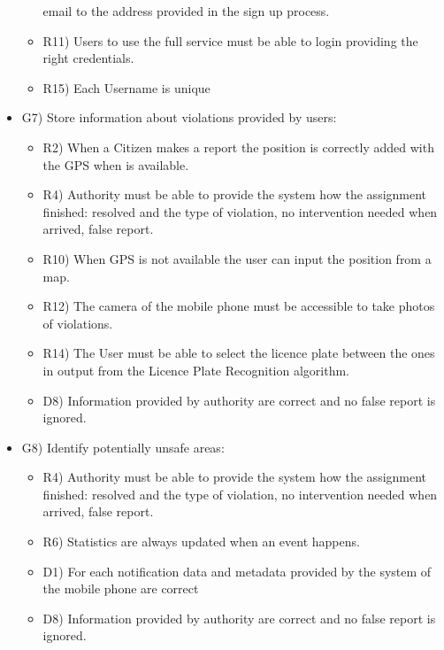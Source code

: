 \begin{itemize}
\begin{itemize}
email to the address provided in the sign up process.
 \item R11) Users to use the full service must be able to login providing the right credentials.
 \item R15) Each Username is unique
\end{itemize}
\item G7) Store information about violations provided by users:
\begin{itemize}
 \item R2) When a Citizen makes a report the position is correctly added with the GPS when is available.
 \item R4) Authority must be able to provide the system how the assignment finished: resolved and the
type of violation, no intervention needed when arrived, false report.
 \item R10) When GPS is not available the user can input the position from a map.
 \item R12) The camera of the mobile phone must be accessible to take photos of violations.
 \item R14) The User must be able to select the licence plate between the ones in output from the Licence
Plate Recognition algorithm.
 \item D8) Information provided by authority are correct and no false report is ignored.

\end{itemize}
\item G8) Identify potentially unsafe areas:
\begin{itemize}
\item R4) Authority must be able to provide the system how the assignment finished: resolved and the
type of violation, no intervention needed when arrived, false report.
\item R6) Statistics are always updated when an event happens.
\item D1) For each notification data and metadata provided by the system of the mobile phone are
correct
\item D8) Information provided by authority are correct and no false report is ignored.


\end{itemize}
\end{itemize}

